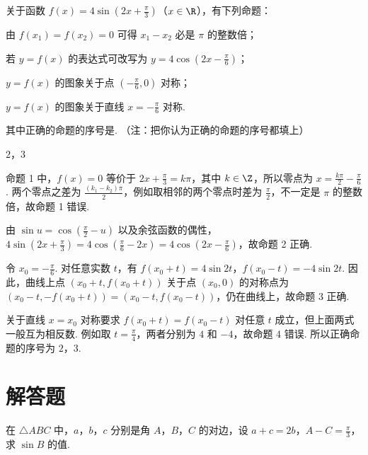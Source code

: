\begin{problem}
关于函数 \(f(x)=4\sin \left(2x+\frac{\pi}{3}\right)\)（\(x\in\R\)），有下列命题：
\begin{circlelist}
\item 由 \(f(x_{1})=f(x_{2})=0\) 可得 \(x_{1}-x_{2}\) 必是 \(\pi\) 的整数倍；
\item 若 \(y=f(x)\) 的表达式可改写为 \(y=4\cos \left(2x-\frac{\pi}{6}\right)\)；
\item \(y=f(x)\) 的图象关于点 \(\left(-\frac{\pi}{6}, 0\right)\) 对称；
\item \(y=f(x)\) 的图象关于直线 \(x=-\frac{\pi}{6}\) 对称.
\end{circlelist}
其中正确的命题的序号是\fillinblank{}. （注：把你认为正确的命题的序号都填上）
\end{problem}

\begin{answer}
\(2\)，\(3\)
\end{answer}

\begin{solution}
命题 1 中，\(f(x)=0\) 等价于 \(2x+\frac{\pi}{3}=k\pi\)，其中 \(k\in\Z\)，所以零点为 \(x=\frac{k\pi}{2}-\frac{\pi}{6}\). 两个零点之差为 \(\frac{(k_{1}-k_{2})\pi}{2}\)，例如取相邻的两个零点时差为 \(\frac{\pi}{2}\)，不一定是 \(\pi\) 的整数倍，故命题 1 错误.

由 \(\sin u=\cos\left(\frac{\pi}{2}-u\right)\) 以及余弦函数的偶性，
\(4\sin\left(2x+\frac{\pi}{3}\right)=4\cos\left(\frac{\pi}{6}-2x\right)=4\cos\left(2x-\frac{\pi}{6}\right)\)，故命题 2 正确.

令 \(x_{0}=-\frac{\pi}{6}\). 对任意实数 \(t\)，有 \(f(x_{0}+t)=4\sin 2t\)，\(f(x_{0}-t)=-4\sin 2t\). 因此，曲线上点 \(\left(x_{0}+t,f(x_{0}+t)\right)\) 关于点 \(\left(x_{0},0\right)\) 的对称点为 \(\left(x_{0}-t,-f(x_{0}+t)\right)=\left(x_{0}-t,f(x_{0}-t)\right)\)，仍在曲线上，故命题 3 正确.

关于直线 \(x=x_{0}\) 对称要求 \(f(x_{0}+t)=f(x_{0}-t)\) 对任意 \(t\) 成立，但上面两式一般互为相反数. 例如取 \(t=\frac{\pi}{4}\)，两者分别为 \(4\) 和 \(-4\)，故命题 4 错误. 所以正确命题的序号为 \(2\)，\(3\).
\end{solution}

\section{解答题}

\begin{problem}
在 \(\triangle ABC\) 中，\(a\)，\(b\)，\(c\) 分别是角 \(A\)，\(B\)，\(C\) 的对边，设 \(a + c = 2b\)，\(A - C = \frac{\pi}{3}\)，求 \(\sin B\) 的值.
\end{problem}

